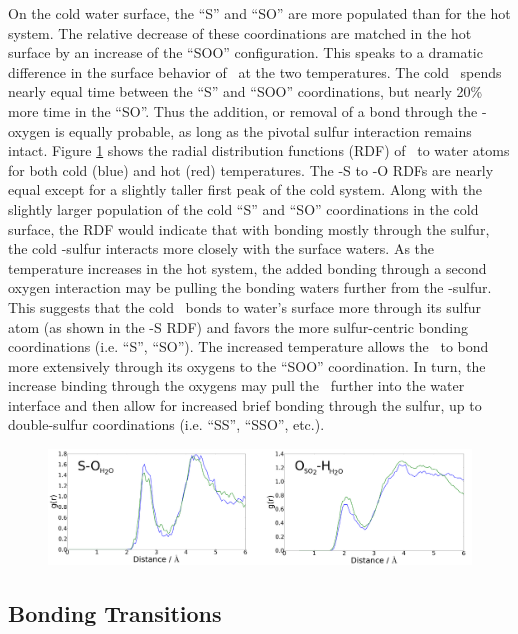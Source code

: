 On the cold water surface, the ``S'' and ``SO'' are more populated than for the hot system. The relative decrease of these coordinations are matched in the hot surface by an increase of the ``SOO'' configuration. This speaks to a dramatic difference in the surface behavior of \suldiox~at the two temperatures. The cold \suldiox~spends nearly equal time between the ``S'' and ``SOO'' coordinations, but nearly 20\% more time in the ``SO''. Thus the addition, or removal of a bond through the \suldiox-oxygen is equally probable, as long as the pivotal sulfur interaction remains intact. Figure \ref{fig:rdf} shows the radial distribution functions (RDF) of \suldiox~to water atoms for both cold (blue) and hot (red) temperatures. The \suldiox-S to \wat-O RDFs are nearly equal except for a slightly taller first peak of the cold system. Along with the slightly larger population of the cold ``S'' and ``SO'' coordinations in the cold surface, the RDF would indicate that with bonding mostly through the sulfur, the cold \suldiox-sulfur interacts more closely with the surface waters. As the temperature increases in the hot system, the added bonding through a second oxygen interaction may be pulling the bonding waters further from the \suldiox-sulfur. This suggests that the cold \suldiox~bonds to water's surface more through its sulfur atom (as shown in the \suldiox-S RDF) and favors the more sulfur-centric bonding coordinations (i.e. ``S'', ``SO''). The increased temperature allows the \suldiox~to bond more extensively through its oxygens to the ``SOO'' coordination. In turn, the increase binding through the oxygens may pull the \suldiox~further into the water interface and then allow for increased brief bonding through the sulfur, up to double-sulfur coordinations (i.e. ``SS'', ``SSO'', etc.).

\begin{figure}[h!]
	\begin{center}
		\includegraphics[scale=1.0]{images/rdf/rdf-small.png}
		\caption{}
		\label{fig:rdf}
	\end{center}
\end{figure}

\subsection {Bonding Transitions}

